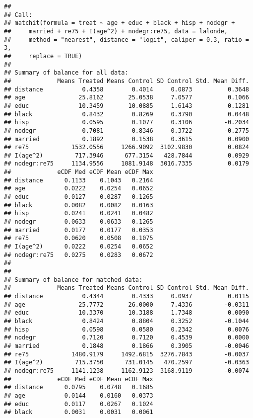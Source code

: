 \documentclass[]{article}
\begin{document}
\begin{verbatim}
## 
## Call:
## matchit(formula = treat ~ age + educ + black + hisp + nodegr + 
##     married + re75 + I(age^2) + nodegr:re75, data = lalonde, 
##     method = "nearest", distance = "logit", caliper = 0.3, ratio = 3, 
##     replace = TRUE)
## 
## Summary of balance for all data:
##             Means Treated Means Control SD Control Std. Mean Diff.
## distance           0.4358        0.4014     0.0873          0.3648
## age               25.8162       25.0538     7.0577          0.1066
## educ              10.3459       10.0885     1.6143          0.1281
## black              0.8432        0.8269     0.3790          0.0448
## hisp               0.0595        0.1077     0.3106         -0.2034
## nodegr             0.7081        0.8346     0.3722         -0.2775
## married            0.1892        0.1538     0.3615          0.0900
## re75            1532.0556     1266.9092  3102.9830          0.0824
## I(age^2)         717.3946      677.3154   428.7844          0.0929
## nodegr:re75     1134.9556     1081.9148  3016.7335          0.0179
##             eCDF Med eCDF Mean eCDF Max
## distance      0.1133    0.1043   0.2164
## age           0.0222    0.0254   0.0652
## educ          0.0127    0.0287   0.1265
## black         0.0082    0.0082   0.0163
## hisp          0.0241    0.0241   0.0482
## nodegr        0.0633    0.0633   0.1265
## married       0.0177    0.0177   0.0353
## re75          0.0620    0.0508   0.1075
## I(age^2)      0.0222    0.0254   0.0652
## nodegr:re75   0.0275    0.0283   0.0672
## 
## 
## Summary of balance for matched data:
##             Means Treated Means Control SD Control Std. Mean Diff.
## distance           0.4344        0.4333     0.0937          0.0115
## age               25.7772       26.0000     7.4336         -0.0311
## educ              10.3370       10.3188     1.7348          0.0090
## black              0.8424        0.8804     0.3252         -0.1044
## hisp               0.0598        0.0580     0.2342          0.0076
## nodegr             0.7120        0.7120     0.4539          0.0000
## married            0.1848        0.1866     0.3905         -0.0046
## re75            1480.9179     1492.6815  3276.7843         -0.0037
## I(age^2)         715.3750      731.0145   470.2597         -0.0363
## nodegr:re75     1141.1238     1162.9123  3168.9119         -0.0074
##             eCDF Med eCDF Mean eCDF Max
## distance      0.0795    0.0748   0.1685
## age           0.0144    0.0160   0.0373
## educ          0.0117    0.0267   0.1024
## black         0.0031    0.0031   0.0061

\end{verbatim}
\end{document}

